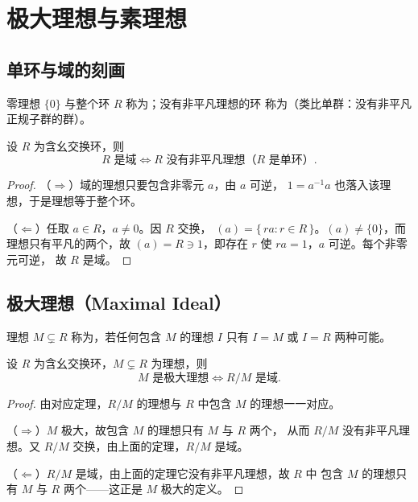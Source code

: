 \section{极大理想与素理想}\label{sec:maximal-prime}

\subsection{单环与域的刻画}

\begin{definition}[平凡理想、单环]
零理想 $\{0\}$ 与整个环 $R$ 称为；没有非平凡理想的环
称为（类比单群：没有非平凡正规子群的群）。
\end{definition}

\begin{theorem}[含幺交换环是域的刻画]
设 $R$ 为含幺交换环，则
\[
  R\text{ 是域} \iff R\text{ 没有非平凡理想（}R\text{ 是单环）}.
\]
\end{theorem}

\begin{proof}
（$\Rightarrow$）域的理想只要包含非零元 $a$，由 $a$ 可逆，
$1 = a^{-1}a$ 也落入该理想，于是理想等于整个环。

（$\Leftarrow$）任取 $a\in R$，$a\ne 0$。因 $R$ 交换，
$(a) = \{\,ra : r\in R\,\}$。$(a)\ne\{0\}$，而理想只有平凡的两个，故
$(a) = R\ni 1$，即存在 $r$ 使 $ra = 1$，$a$ 可逆。每个非零元可逆，
故 $R$ 是域。
\end{proof}

\subsection{极大理想（Maximal Ideal）}

\begin{definition}[极大理想]
理想 $M\subsetneq R$ 称为，若任何包含 $M$ 的理想
$I$ 只有 $I = M$ 或 $I = R$ 两种可能。
\end{definition}

\begin{theorem}[极大理想的刻画]
设 $R$ 为含幺交换环，$M\subsetneq R$ 为理想，则
\[
  M\text{ 是极大理想} \iff R/M\text{ 是域}.
\]
\end{theorem}

\begin{proof}
由对应定理，$R/M$ 的理想与 $R$ 中包含 $M$ 的理想一一对应。

（$\Rightarrow$）$M$ 极大，故包含 $M$ 的理想只有 $M$ 与 $R$ 两个，
从而 $R/M$ 没有非平凡理想。又 $R/M$ 交换，由上面的定理，$R/M$ 是域。

（$\Leftarrow$）$R/M$ 是域，由上面的定理它没有非平凡理想，故 $R$ 中
包含 $M$ 的理想只有 $M$ 与 $R$ 两个——这正是 $M$ 极大的定义。
\end{proof}

